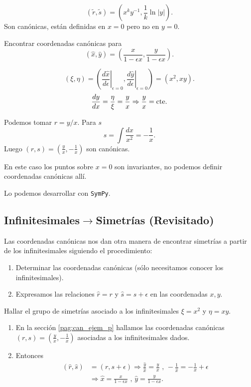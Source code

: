 \[(\tilde{r},\tilde{s})=(x^ky^{-1},\frac{1}{k}\ln|y|).\]
Son canónicas, están definidas en $x=0$ pero no en $y=0$.  


\begin{ejemplo} Encontrar coordenadas canónicas para
\[(\hat{x},\hat{y})=\left( \frac{x}{1-\epsilon x},\frac{y}{1-\epsilon x}\right).\]
\end{ejemplo}

\[(\xi,\eta)=\left(\left.\frac{d\hat{x}}{d\epsilon}\right|_{\epsilon=0},\left.\frac{d\hat{y}}{d\epsilon}\right|_{\epsilon=0}\right)=(x^2,xy).\]
\label{pag:can_ejem_p}
\[\frac{dy}{dx}=\frac{\eta}{\xi}=\frac{y}{x}\Rightarrow \frac{y}{x}=\hbox{cte}.\]

Podemos tomar $r=y/x$. Para $s$
\[s=\int\frac{dx}{x^2}=-\frac{1}{x}.\]
Luego $(r,s)=(\frac{y}{x},-\frac{1}{x})$ son canónicas.

En este caso los puntos sobre $x=0$ son invariantes, no podemos definir coordenadas canónicas allí.

Lo podemos desarrollar con \texttt{SymPy}. 
 




\subsection{Infinitesimales$\to$Simetrías (Revisitado)}
Las coordenadas canónicas nos dan otra manera de encontrar simetrías a partir de los infinitesimales siguiendo el procedimiento:

\begin{enumerate}
\item Determinar las coordenadas canónicas  (sólo necesitamos conocer los infinitesimales).
\item Expresamos las relaciones $\hat{r}=r$ y $\hat{s}=s+\epsilon$ en las coordenadas $x,y$.
\end{enumerate}


\begin{ejemplo} Hallar el grupo de simetrías asociado a los infinitesimales 
$\xi=x^2$ y $\eta=xy$.
\end{ejemplo}


\begin{enumerate}
\item En la sección \ref{pag:can_ejem_p} hallamos las coordenadas canónicas $(r,s)=\left(\frac{y}{x},-\frac{1}{x}\right)$ asociadas a los infinitesimales dados.
\item Entonces
\[\begin{split}
(\hat{r},\hat{s})&=(r,s+\epsilon)\Rightarrow \frac{\hat{y}}{\hat{x}}=\frac{y}{x}\text{ , }-\frac{1}{\hat{x}}=-\frac{1}{x}+\epsilon\\
&\Rightarrow \hat{x}=\frac{x}{1-\epsilon x} \text{ , } \hat{y}=\frac{y}{1-\epsilon x}.
\end{split}
\] 
\end{enumerate}



